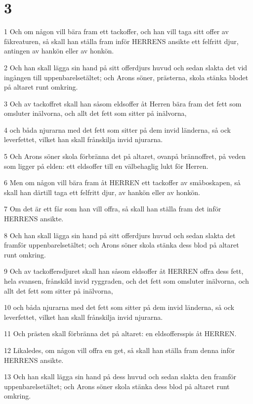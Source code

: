 \chapter{3}

\par 1 Och om någon vill bära fram ett tackoffer, och han vill taga sitt offer av fäkreaturen, så skall han ställa fram inför HERRENS ansikte ett felfritt djur, antingen av hankön eller av honkön.
\par 2 Och han skall lägga sin hand på sitt offerdjurs huvud och sedan slakta det vid ingången till uppenbarelsetältet; och Arons söner, prästerna, skola stänka blodet på altaret runt omkring.
\par 3 Och av tackoffret skall han såsom eldsoffer åt Herren bära fram det fett som omsluter inälvorna, och allt det fett som sitter på inälvorna,
\par 4 och båda njurarna med det fett som sitter på dem invid länderna, så ock leverfettet, vilket han skall frånskilja invid njurarna.
\par 5 Och Arons söner skola förbränna det på altaret, ovanpå brännoffret, på veden som ligger på elden: ett eldsoffer till en välbehaglig lukt för Herren.
\par 6 Men om någon vill bära fram åt HERREN ett tackoffer av småboskapen, så skall han därtill taga ett felfritt djur, av hankön eller av honkön.
\par 7 Om det är ett får som han vill offra, så skall han ställa fram det inför HERRENS ansikte.
\par 8 Och han skall lägga sin hand på sitt offerdjurs huvud och sedan slakta det framför uppenbarelsetältet; och Arons söner skola stänka dess blod på altaret runt omkring.
\par 9 Och av tackoffersdjuret skall han såsom eldsoffer åt HERREN offra dess fett, hela svansen, frånskild invid ryggraden, och det fett som omsluter inälvorna, och allt det fett som sitter på inälvorna,
\par 10 och båda njurarna med det fett som sitter på dem invid länderna, så ock leverfettet, vilket han skall frånskilja invid njurarna.
\par 11 Och prästen skall förbränna det på altaret: en eldsoffersspis åt HERREN.
\par 12 Likaledes, om någon vill offra en get, så skall han ställa fram denna inför HERRENS ansikte.
\par 13 Och han skall lägga sin hand på dess huvud och sedan slakta den framför uppenbarelsetältet; och Arons söner skola stänka dess blod på altaret runt omkring.
